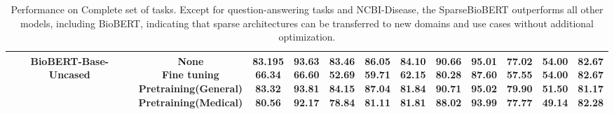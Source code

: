 \documentclass[10pt]{article}
\begin{document}
\begin{table*}[htb!]
{\begin{tabular}{cc|ccccc|ccc|cc}
    \midrule
    BioBERT-Base-Uncased &  \makecell{None \\ Fine tuning \\ Pretraining(General) \\ Pretraining(Medical)}  &\makecell{83.195 \\ 66.34 \\\textbf{83.32} \\ 80.56 } &  \makecell{93.63 \\ 66.60 \\ \textbf{93.81} \\92.17 } & \makecell{83.46 \\ 52.69 \\ 84.15 \\ 78.84}&  \makecell{86.05 \\ 59.71 \\\textbf{87.04} \\ 81.11} &  \makecell{\textbf{84.10} \\62.15 \\ 81.84 \\ 81.81 } &   \makecell{90.66 \\ 80.28 \\ \textbf{90.71} \\ 88.02} &  \makecell{95.01 \\ 87.60  \\ \textbf{95.02} \\ 93.99} &  \makecell{77.02 \\ 57.55 \\ \textbf{79.90} \\ 77.77} &   \makecell{\textbf{54.00}\\ \textbf{54.00} \\ 51.50 \\ 49.14} &  \makecell{\textbf{82.67}\\ \textbf{82.67} \\ 81.17 \\ 82.28} \\
    \bottomrule
    \end{tabular}
    }
    \caption{Performance on Complete set of tasks. Except for question-answering tasks and NCBI-Disease, the SparseBioBERT outperforms all other models, including BioBERT, indicating that sparse architectures can be transferred to new domains and use cases without additional optimization. }
    \label{tab:full}
    \vspace{-1.2em}
\end{table*}
\end{document}
